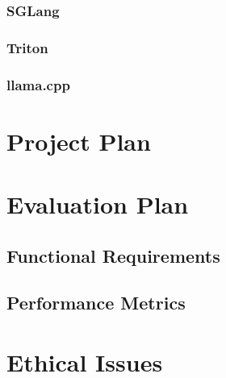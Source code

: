 \documentclass[12pt,twoside]{report}
\begin{document}
\subsection{SGLang}
\subsection{Triton}
\subsection{llama.cpp} \label{section:llamacpp}


\chapter{Project Plan} %

\chapter{Evaluation Plan} %
\begin{comment}
1. Run some benchmark on llama.cpp
2. Run same benchmark on llama.cpp + my system
3. ...
4. Profit???

Key requirements for project

Areas on which I could track performance relative to existing system
- Efficiency (\% of overall resources used)
- Throughput (tokens/sec)
\end{comment}

\section{Functional Requirements}
\section{Performance Metrics}


\chapter{Ethical Issues} %




\end{document}

